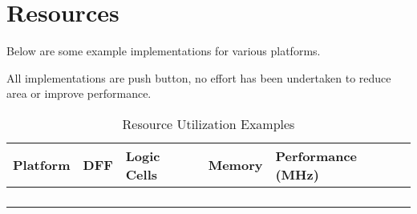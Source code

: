 \chapter{Resources}\label{resources}

Below are some example implementations for various platforms.

All implementations are push button, no effort has been undertaken to
reduce area or improve performance.

\begin{longtable}[]{@{}lllll@{}}
	\toprule
	Platform & DFF & Logic Cells & Memory & Performance (MHz)\tabularnewline
	\midrule
	\endhead
	& & & &\tabularnewline
	& & & &\tabularnewline
	& & & &\tabularnewline
	\bottomrule
	\caption{Resource Utilization Examples}
\end{longtable}
